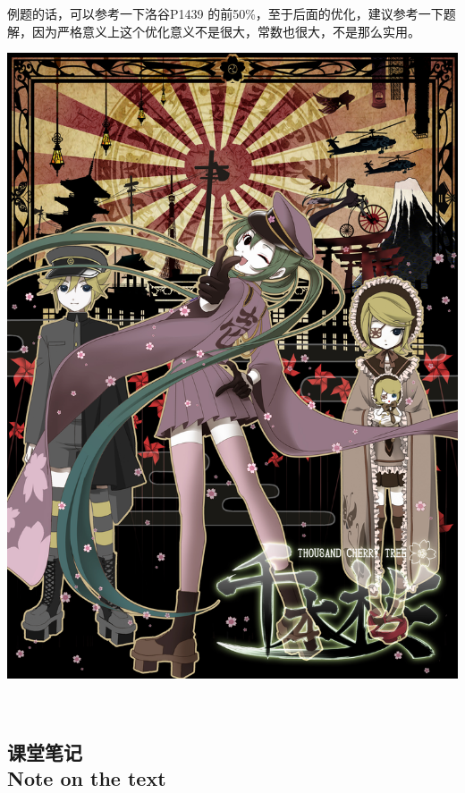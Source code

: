 \documentclass{article}
\theoremstyle{nonumberplain}
\newcommand{\note}{\ \par


	\subsection*{课堂笔记\\\tiny{Note on the text}}
	\newpage}
\begin{document}
例题的话，可以参考一下洛谷P1439 的前50\%，至于后面的优化，建议参考一下题解，因为严格意义上这个优化意义不是很大，常数也很大，不是那么实用。
\begin{center}\includegraphics[scale=0.15]{21804232_p0.jpg}\end{center}
\note
\end{document}
